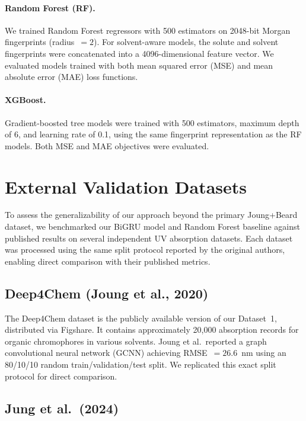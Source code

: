 \documentclass[11pt,a4paper]{article}
\begin{document}
\paragraph{Random Forest (RF).} We trained Random Forest regressors with 500 estimators on 2048-bit Morgan fingerprints (radius~$= 2$). For solvent-aware models, the solute and solvent fingerprints were concatenated into a 4096-dimensional feature vector. We evaluated models trained with both mean squared error (MSE) and mean absolute error (MAE) loss functions.

\paragraph{XGBoost.} Gradient-boosted tree models were trained with 500 estimators, maximum depth of 6, and learning rate of 0.1, using the same fingerprint representation as the RF models. Both MSE and MAE objectives were evaluated.

\section{External Validation Datasets}
\label{sec:datasets}

To assess the generalizability of our approach beyond the primary Joung+Beard dataset, we benchmarked our BiGRU model and Random Forest baseline against published results on several independent UV absorption datasets. Each dataset was processed using the same split protocol reported by the original authors, enabling direct comparison with their published metrics.

\subsection{Deep4Chem (Joung et al., 2020)}

The Deep4Chem dataset \cite{joungExperimentalDatabaseOptical2020} is the publicly available version of our Dataset~1, distributed via Figshare. It contains approximately 20,000 absorption records for organic chromophores in various solvents. Joung et al.\ reported a graph convolutional neural network (GCNN) achieving RMSE~$= 26.6$~nm using an 80/10/10 random train/validation/test split. We replicated this exact split protocol for direct comparison.

\subsection{Jung et al.\ (2024)}
\end{document}
